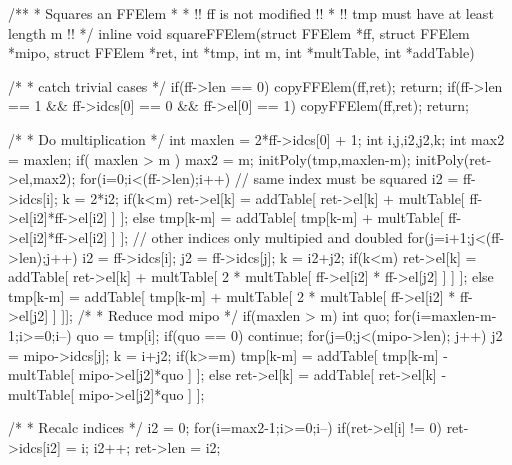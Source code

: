 \begin{ccode}[caption={[\texttt{void squareFFElem} aus 
 \url{../Sage/enumeratePCNs.c}]Aus \url{../Sage/enumeratePCNs.c}}]
/**
 * Squares an FFElem
 *
 * !! ff is not modified !!
 * !! tmp must have at least length m !!
 */
inline void squareFFElem(struct FFElem *ff, struct FFElem *mipo,
        struct FFElem *ret, int *tmp, int m,
        int *multTable, int *addTable){
    /* 
     * catch trivial cases
     */
    if(ff->len == 0){
        copyFFElem(ff,ret);
        return;
    }
    if(ff->len == 1 && ff->idcs[0] == 0 && ff->el[0] == 1){
        copyFFElem(ff,ret);
        return;
    }

    /*
     * Do multiplication
     */
    int maxlen = 2*ff->idcs[0] + 1;
    int i,j,i2,j2,k;
    int max2 = maxlen;
    if( maxlen > m ){
        max2 = m;
        initPoly(tmp,maxlen-m);
    }
    initPoly(ret->el,max2);
    for(i=0;i<(ff->len);i++){
        // same index must be squared
        i2 = ff->idcs[i];
        k = 2*i2;
        if(k<m){
            ret->el[k] = addTable[ ret->el[k] + 
                multTable[ ff->el[i2]*ff->el[i2] ] ];
        }else{
            tmp[k-m] = addTable[ tmp[k-m] +
                multTable[ ff->el[i2]*ff->el[i2] ] ];
        }
        // other indices only multipied and doubled
        for(j=i+1;j<(ff->len);j++){
            i2 = ff->idcs[i];
            j2 = ff->idcs[j];
            k = i2+j2;
            if(k<m){
                ret->el[k] = addTable[ ret->el[k] + 
                    multTable[ 2 * multTable[ ff->el[i2] * ff->el[j2] ] ] ];
            }else{
                tmp[k-m] = addTable[ tmp[k-m] +
                    multTable[ 2 * multTable[ ff->el[i2] * ff->el[j2] ] ]];
            }
        }
    }
    /*
     * Reduce mod mipo
     */
    if(maxlen > m){
        int quo;
        for(i=maxlen-m-1;i>=0;i--){
            quo = tmp[i];
            if(quo == 0) continue;
            for(j=0;j<(mipo->len); j++){
                j2 = mipo->idcs[j];
                k = i+j2;
                if(k>=m){
                    tmp[k-m] = addTable[ tmp[k-m] - 
                        multTable[ mipo->el[j2]*quo ] ];
                }else{
                    ret->el[k] = addTable[ ret->el[k] - 
                        multTable[ mipo->el[j2]*quo ] ];
                }
            }
        }
    }

    /*
     * Recalc indices
     */
    i2 = 0;
    for(i=max2-1;i>=0;i--){
        if(ret->el[i] != 0){
            ret->idcs[i2] = i;
            i2++;
        }
    }
    ret->len = i2;
}
\end{ccode}


